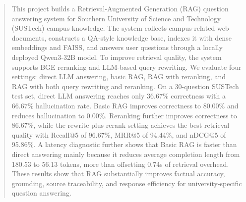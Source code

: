 





\begin{abstract}
This project builds a Retrieval-Augmented Generation (RAG) question answering system for Southern University of Science and Technology (SUSTech) campus knowledge. The system collects campus-related web documents, constructs a QA-style knowledge base, indexes it with dense embeddings and FAISS, and answers user questions through a locally deployed Qwen3-32B model. To improve retrieval quality, the system supports BGE reranking and LLM-based query rewriting. We evaluate four settings: direct LLM answering, basic RAG, RAG with reranking, and RAG with both query rewriting and reranking. On a 30-question SUSTech test set, direct LLM answering reaches only 36.67\% correctness with a 66.67\% hallucination rate. Basic RAG improves correctness to 80.00\% and reduces hallucination to 0.00\%. Reranking further improves correctness to 86.67\%, while the rewrite-plus-rerank setting achieves the best retrieval quality with Recall@5 of 96.67\%, MRR@5 of 94.44\%, and nDCG@5 of 95.86\%. A latency diagnostic further shows that Basic RAG is faster than direct answering mainly because it reduces average completion length from 180.53 to 56.13 tokens, more than offsetting 0.74s of retrieval overhead. These results show that RAG substantially improves factual accuracy, grounding, source traceability, and response efficiency for university-specific question answering.
\end{abstract}


